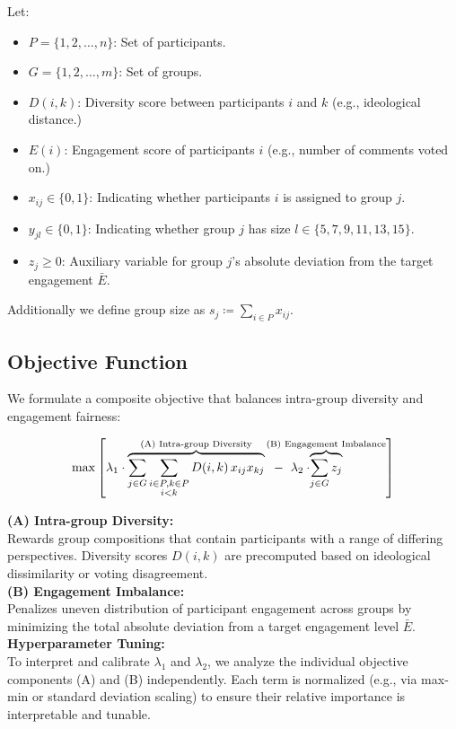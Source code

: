 Let:
\begin{itemize}
    \item $P = \{1, 2, \dots, n\}$: Set of participants.
    \item $G = \{1, 2, \dots, m\}$: Set of groups.
    \item $D(i,k)$: Diversity score between participants $i$ and $k$ (e.g., ideological distance.)
    \item $E(i)$: Engagement score of participants $i$ (e.g., number of comments voted on.)
    \item $x_{ij} \in \{0,1\}$: Indicating whether participants $i$ is assigned to group $j$.
    \item $y_{jl} \in \{0,1\}$: Indicating whether group $j$ has size $l \in \{5,7,9,11,13,15\}$.
    \item $z_j \geq 0$: Auxiliary variable for group $j$’s absolute deviation from the target engagement $\bar{E}$.
\end{itemize}

\noindent
Additionally we define group size as $s_j \coloneqq \sum_{i \in P} x_{ij}$.

\subsection*{Objective Function}

We formulate a composite objective that balances intra-group diversity and engagement fairness:

\[
\max \left[
\lambda_1 \cdot \overbrace{
\sum_{j \in G} \sum_{\substack{i \in P, k \in P \\ i < k}} D(i,k)\,x_{ij} x_{kj}
  }^{\text{(A) Intra-group Diversity}}
\hspace{0.2cm} - \hspace{0.2cm} \lambda_2 \cdot \hspace{-1.3cm} \overbrace{
\sum_{j \in G} z_j
}^{\text{(B) Engagement Imbalance}}
\right]
\]

\noindent
\textbf{(A) Intra-group Diversity:}\\[3pt]
Rewards group compositions that contain participants with a range of differing perspectives.
Diversity scores \(D(i,k)\) are precomputed based on ideological dissimilarity or voting disagreement.
\\
\textbf{(B) Engagement Imbalance:}\\[3pt]
Penalizes uneven distribution of participant engagement across groups by minimizing the total absolute deviation
from a target engagement level \(\bar{E}\).
\\
\textbf{Hyperparameter Tuning:}\\[3pt]
To interpret and calibrate \(\lambda_1\) and \(\lambda_2\), we analyze the individual objective components (A)
and (B) independently.
Each term is normalized (e.g., via max-min or standard deviation scaling)
to ensure their relative importance is interpretable and tunable.

